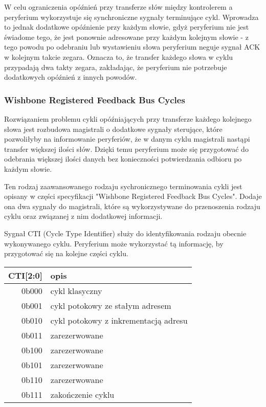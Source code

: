 
W celu ograniczenia opóźnień przy transferze słów między kontrolerem a peryferium wykorzystuje się synchroniczne sygnały terminujące cykl. Wprowadza to jednak dodatkowe opóźnienie przy każdym słowie, gdyż peryferium nie jest świadome tego, że jest ponownie adresowane przy każdym kolejnym słowie - z tego powodu po odebraniu lub wystawieniu słowa peryferium neguje sygnał ACK w kolejnym takcie zegara. Oznacza to, że transfer każdego słowa w cyklu przypadają dwa takty zegara, zakładając, że peryferium nie potrzebuje dodatkowych opóźnień z innych powodów.

\subsubsection{Wishbone Registered Feedback Bus Cycles}

Rozwiązaniem problemu cykli opóźniających przy transferze każdego kolejnego słowa jest rozbudowa magistrali o dodatkowe sygnały sterujące, które pozwoliłyby na informowanie peryferiów, że w danym cyklu magistrali nastąpi transfer większej ilości słów. Dzięki temu peryferium może się przygotować do odebrania większej ilości danych bez konieczności potwierdzania odbioru po każdym słowie.

Ten rodzaj zaawansowanego rodzaju sychronicznego terminowania cykli jest opisany w części specyfikacji "Wishbone Registered Feedback Bus Cycles". Dodaje ona dwa sygnały do magistrali, które są wykorzystywane do przenoszenia rodzaju cyklu oraz związanej z nim dodatkowej informacji.

Sygnał CTI (Cycle Type Identifier) służy do identyfikowania rodzaju obecnie wykonywanego cyklu. Peryferium może wykorzystać tą informację, by przygotować się na kolejne części cyklu.
\begin{center}
\begin{tabular}{ r|l }
 CTI[2:0] & opis \\ 
 \hline
 0b000 & cykl klasyczny \\
 0b001 & cykl potokowy ze stałym adresem \\
 0b010 & cykl potokowy z inkrementacją adresu \\
 0b011 & zarezerwowane \\
 0b100 & zarezerwowane \\
 0b101 & zarezerwowane \\
 0b110 & zarezerwowane \\
 0b111 & zakończenie cyklu \\
 \hline
\end{tabular}
\end{center}

